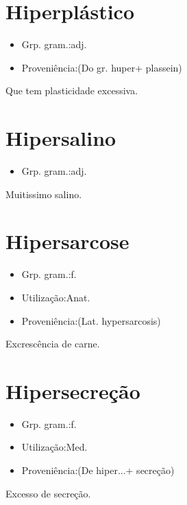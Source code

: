 \documentclass{article}
\begin{document}
\section{Hiperplástico}
\begin{itemize}
\item {Grp. gram.:adj.}
\end{itemize}
\begin{itemize}
\item {Proveniência:(Do gr. \textunderscore huper\textunderscore  + \textunderscore plassein\textunderscore )}
\end{itemize}
Que tem plasticidade excessiva.
\section{Hipersalino}
\begin{itemize}
\item {Grp. gram.:adj.}
\end{itemize}
Muitissimo salino.
\section{Hipersarcose}
\begin{itemize}
\item {Grp. gram.:f.}
\end{itemize}
\begin{itemize}
\item {Utilização:Anat.}
\end{itemize}
\begin{itemize}
\item {Proveniência:(Lat. \textunderscore hypersarcosis\textunderscore )}
\end{itemize}
Excrescência de carne.
\section{Hipersecreção}
\begin{itemize}
\item {Grp. gram.:f.}
\end{itemize}
\begin{itemize}
\item {Utilização:Med.}
\end{itemize}
\begin{itemize}
\item {Proveniência:(De \textunderscore hiper...\textunderscore  + \textunderscore secreção\textunderscore )}
\end{itemize}
Excesso de secreção.
\end{document}
